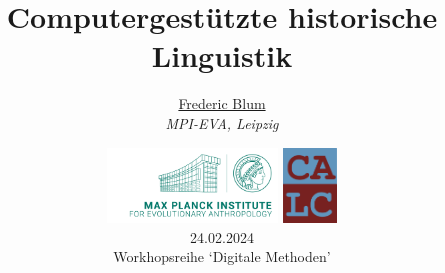 \title[Digitale Methoden]
{Computergestützte historische Linguistik}

\author[Frederic Blum]
    {%
           \texorpdfstring{\Large
					\centering
					\href{mailto:frederic_blum@eva.mpg.de.de}{Frederic Blum} \\
					\textit{\small{MPI-EVA, Leipzig}}
				\vspace*{-0.5cm}
        }
       {Blum}
}

\date{\hspace*{-1cm}
	\includegraphics[height=2cm]{images/title_MPI.png} \hspace*{0.5cm}
	\includegraphics[height=2cm]{images/title_calc.jpg} \vspace*{0.5cm}\\
	24.02.2024  \\ \footnotesize Workhopsreihe `Digitale Methoden'
	}